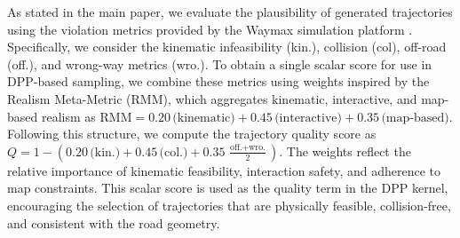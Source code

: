\documentclass[runningheads]{llncs}
\begin{document}
As stated in the main paper, we evaluate the plausibility of generated trajectories using the violation metrics provided by the Waymax simulation platform \cite{gulino2023waymax}. Specifically, we consider the kinematic infeasibility (kin.), collision (col), off-road (off.), and wrong-way metrics (wro.). To obtain a single scalar score for use in DPP-based sampling, we combine these metrics using weights inspired by the Realism Meta-Metric (RMM), which aggregates kinematic, interactive, and map-based realism as $\mathrm{RMM} = 0.20\,\text{(kinematic)} + 0.45\,\text{(interactive)} + 0.35\,\text{(map-based)}$. Following this structure, we compute the trajectory quality score as $Q = 1 - (0.20\,\text{(kin.)} + 0.45\,\text{(col.)} + 0.35\,\frac{\text{off.} + \text{wro.}}{2})$. The weights reflect the relative importance of kinematic feasibility, interaction safety, and adherence to map constraints. This scalar score is used as the quality term in the DPP kernel, encouraging the selection of trajectories that are physically feasible, collision-free, and consistent with the road geometry.
\end{document}
